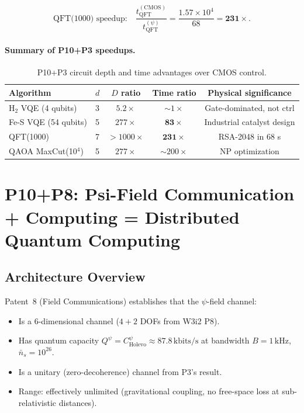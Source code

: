 \documentclass[11pt]{article}
\theoremstyle{definition}
\theoremstyle{remark}
\begin{document}
\begin{equation}
\boxed{
\text{QFT(1000) speedup:} \quad
\frac{t_{\mathrm{QFT}}^{(\mathrm{CMOS})}}{t_{\mathrm{QFT}}^{(\psi)}}
= \frac{1.57\times10^4}{68} = \mathbf{231\times}.
}
\label{eq:qft_speedup}
\end{equation}

\paragraph{Summary of P10+P3 speedups.}
\begin{table}[h]
\centering
\caption{P10+P3 circuit depth and time advantages over CMOS control.}
\label{tab:circuit_advantage}
\begin{tabular}{@{}lcccc@{}}
\toprule
Algorithm & $d$ & $D$ ratio & Time ratio & Physical significance \\
\midrule
H$_2$ VQE (4 qubits) & 3 & $5.2\times$ & $\sim1\times$ & Gate-dominated, not ctrl \\
Fe-S VQE (54 qubits) & 5 & $277\times$ & $\mathbf{83\times}$ & Industrial catalyst design \\
QFT(1000) & 7 & $>1000\times$ & $\mathbf{231\times}$ & RSA-2048 in 68 s \\
QAOA MaxCut(10$^4$) & 5 & $277\times$ & $\sim200\times$ & NP optimization \\
\bottomrule
\end{tabular}
\end{table}

\section{P10+P8: Psi-Field Communication + Computing = Distributed
Quantum Computing}
\label{sec:distributed_qc}

\subsection{Architecture Overview}

Patent~8 (Field Communications) establishes that the $\psi$-field channel:
\begin{itemize}[nosep]
\item Is a 6-dimensional channel ($4+2$ DOFs from W3i2 P8).
\item Has quantum capacity $Q^\psi = C_{\mathrm{Holevo}}^\psi \approx 87.8\,\mathrm{kbits/s}$
  at bandwidth $B = 1\,\mathrm{kHz}$, $\bar{n}_s = 10^{26}$.
\item Is a unitary (zero-decoherence) channel from P3's result.
\item Range: effectively unlimited (gravitational coupling, no free-space loss
  at sub-relativistic distances).
\end{itemize}
\end{document}
